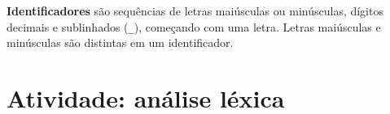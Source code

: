 \documentclass[a4paper,10pt,brazil]{article}
\newcommand{\lang}{\textsl{Torben}}
\begin{document}
\textbf{Identificadores} são sequências de letras maiúsculas ou
minúsculas, dígitos decimais e sublinhados (\texttt{\_}), começando
com uma letra. Letras maiúsculas e minúsculas são distintas em um
identificador.


\begin{comment}
\section{Atividade: front-end do compilador}

\begin{task}[breakable]{Implementação}{}
Implementar o \emph{front-end} do compilador de \lang{}, incluindo:
\begin{enumerate}
  \item analisador léxico, usando o gerador de analisadores léxico
  \emph{JFlex}
  \item analisador sintático, usando o gerador de analisador sintático
  \emph{CUP}
  \item representação dos programas como árvores de sintaxe abstrata,
  usando ações semânticas nas regrras de produção da gramática livre
  de contexto usada pelo \emph{CUP}
\end{enumerate}

A aplicação deverá aceitar o nome do programa fonte a ser compilado
como argumento da linha de comando, realizar as análise léxica e
sintática do mesmo, e exibir a árvore de sintaxe abstrata quando não
houver erros léxicos ou sintáticos.

As seguintes construções são opcionais:
\begin{itemize}
  \item comentários de bloco
  \item strings
  \item expressão de repetição
\end{itemize}
\end{task}

\begin{task}[breakable]{Testes}{}
  Desenvolver um conjunto de programas na linguagem \lang{} que
  permita testar todas as construções da linguagem implementadas, e
  usá-los para testar o seu compilador.
\end{task}
\end{comment}


\section{Atividade: análise léxica}
\end{document}
